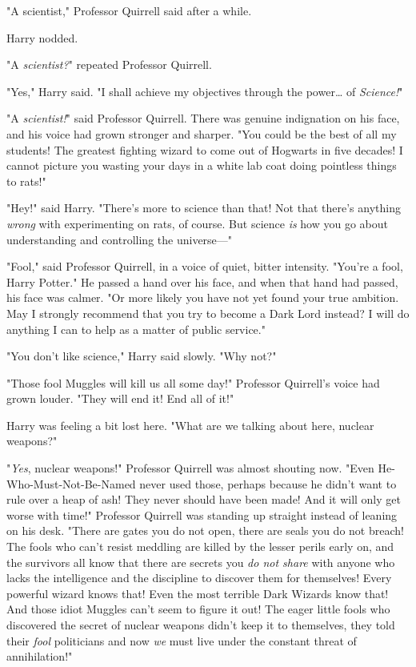 "A scientist," Professor Quirrell said after a while.

Harry nodded.

"A \emph{scientist?}" repeated Professor Quirrell.

"Yes," Harry said. "I shall achieve my objectives through the power{\ldots} of
\emph{Science!}"

"A \emph{scientist!}" said Professor Quirrell. There was genuine indignation on
his face, and his voice had grown stronger and sharper. "You could be the best
of all my students! The greatest fighting wizard to come out of Hogwarts in
five decades! I cannot picture you wasting your days in a white lab coat doing
pointless things to rats!"

"Hey!" said Harry. "There's more to science than that! Not that there's
anything \emph{wrong} with experimenting on rats, of course. But science
\emph{is} how you go about understanding and controlling the universe---"

"Fool," said Professor Quirrell, in a voice of quiet, bitter intensity. "You're
a fool, Harry Potter." He passed a hand over his face, and when that hand had
passed, his face was calmer. "Or more likely you have not yet found your true
ambition. May I strongly recommend that you try to become a Dark Lord instead?
I will do anything I can to help as a matter of public service."

"You don't like science," Harry said slowly. "Why not?"

"Those fool Muggles will kill us all some day!" Professor Quirrell's voice had
grown louder. "They will end it! End all of it!"

Harry was feeling a bit lost here. "What are we talking about here, nuclear
weapons?"

"\emph{Yes}, nuclear weapons!" Professor Quirrell was almost shouting now.
"Even He-Who-Must-Not-Be-Named never used those, perhaps because he didn't want
to rule over a heap of ash! They never should have been made! And it will only
get worse with time!" Professor Quirrell was standing up straight instead of
leaning on his desk. "There are gates you do not open, there are seals you do
not breach! The fools who can't resist meddling are killed by the lesser perils
early on, and the survivors all know that there are secrets you \emph{do not
share} with anyone who lacks the intelligence and the discipline to discover
them for themselves! Every powerful wizard knows that! Even the most terrible
Dark Wizards know that! And those idiot Muggles can't seem to figure it out!
The eager little fools who discovered the secret of nuclear weapons didn't keep
it to themselves, they told their \emph{fool} politicians and now \emph{we}
must live under the constant threat of annihilation!"

